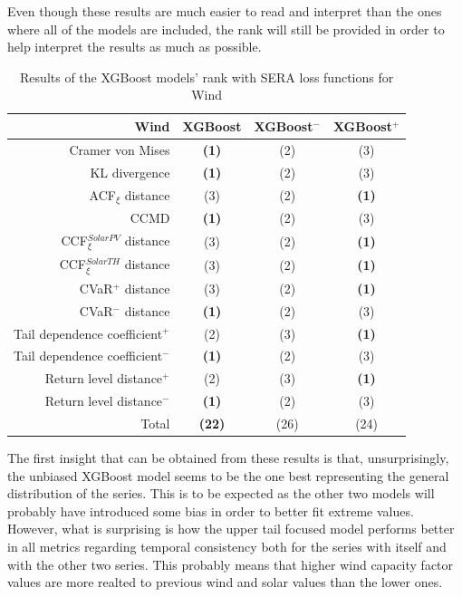 Even though these results are much easier to read and interpret than the ones where all of the models are included, the rank will still be provided in order to help interpret the results as much as possible. 

\begin{table}[ht]
    \centering
    \footnotesize
    \begin{tabular}[r]{r|c|cc}
        \toprule
        \textbf{Wind}&XGBoost&XGBoost$^-$&XGBoost$^+$ \\
        \midrule            
        Cramer von Mises&\textbf{(1)}&(2)&(3) \\
        KL divergence&\textbf{(1)}&(2)&(3) \\
        ACF$_\xi$ distance&(3)&(2)&\textbf{(1)} \\
        \midrule
        CCMD&\textbf{(1)}&(2)&(3) \\
        CCF$_\xi^{Solar PV}$ distance&(3)&(2)&\textbf{(1)} \\
        CCF$_\xi^{Solar TH}$ distance&(3)&(2)&\textbf{(1)} \\
        \midrule
        CVaR$^+$ distance&(3)&(2)&\textbf{(1)} \\
        CVaR$^-$ distance&\textbf{(1)}&(2)&(3) \\
        Tail dependence coefficient$^+$&(2)&(3)&\textbf{(1)} \\
        Tail dependence coefficient$^-$&\textbf{(1)}&(2)&(3) \\
        Return level distance$^+$&(2)&(3)&\textbf{(1)} \\
        Return level distance$^-$&\textbf{(1)}&(2)&(3) \\
        \bottomrule
        Total&\textbf{(22)}&(26)&(24) \\
        \bottomrule
    \end{tabular}
    \caption{Results of the XGBoost models' rank with SERA loss functions for Wind\label{long}}
    \label{table:results-rank-custom-loss}
\end{table}

The first insight that can be obtained from these results is that, unsurprisingly, the unbiased XGBoost model seems to be the one best representing the general distribution of the series. This is to be expected as the other two models will probably have introduced some bias in order to better fit extreme values. However, what is surprising is how the upper tail focused model performs better in all metrics regarding temporal consistency both for the series with itself and with the other two series. This probably means that higher wind capacity factor values are more realted to previous wind and solar values than the lower ones. 

